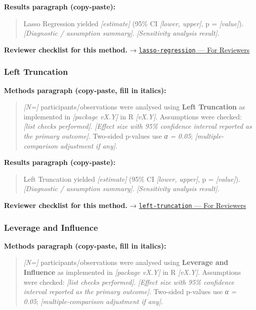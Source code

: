 \documentclass[
]{article}
\begin{document}
\textbf{Results paragraph (copy-paste):}

\begin{quote}
Lasso Regression yielded \emph{{[}estimate{]}} (95\% CI \emph{{[}lower,
upper{]}}, p = \emph{{[}value{]}}). \emph{{[}Diagnostic / assumption
summary{]}}. \emph{{[}Sensitivity analysis result{]}}.
\end{quote}

\textbf{Reviewer checklist for this method.} →
\href{../chapters/07-regression/lasso-regression.Rmd\#for-reviewers}{\texttt{lasso-regression}
--- For Reviewers}

\subsubsection{Left Truncation}\label{left-truncation}

\textbf{Methods paragraph (copy-paste, fill in italics):}

\begin{quote}
\emph{{[}N={]}} participants/observations were analysed using
\textbf{Left Truncation} as implemented in \emph{{[}package vX.Y{]}} in
R \emph{{[}vX.Y{]}}. Assumptions were checked: \emph{{[}list checks
performed{]}}. \emph{{[}Effect size with 95\% confidence interval
reported as the primary outcome{]}}. Two-sided p-values use \emph{α =
0.05}; \emph{{[}multiple-comparison adjustment if any{]}}.
\end{quote}

\textbf{Results paragraph (copy-paste):}

\begin{quote}
Left Truncation yielded \emph{{[}estimate{]}} (95\% CI \emph{{[}lower,
upper{]}}, p = \emph{{[}value{]}}). \emph{{[}Diagnostic / assumption
summary{]}}. \emph{{[}Sensitivity analysis result{]}}.
\end{quote}

\textbf{Reviewer checklist for this method.} →
\href{../chapters/11-survival/left-truncation.Rmd\#for-reviewers}{\texttt{left-truncation}
--- For Reviewers}

\subsubsection{Leverage and Influence}\label{leverage-and-influence}

\textbf{Methods paragraph (copy-paste, fill in italics):}

\begin{quote}
\emph{{[}N={]}} participants/observations were analysed using
\textbf{Leverage and Influence} as implemented in \emph{{[}package
vX.Y{]}} in R \emph{{[}vX.Y{]}}. Assumptions were checked: \emph{{[}list
checks performed{]}}. \emph{{[}Effect size with 95\% confidence interval
reported as the primary outcome{]}}. Two-sided p-values use \emph{α =
0.05}; \emph{{[}multiple-comparison adjustment if any{]}}.
\end{quote}
\end{document}
